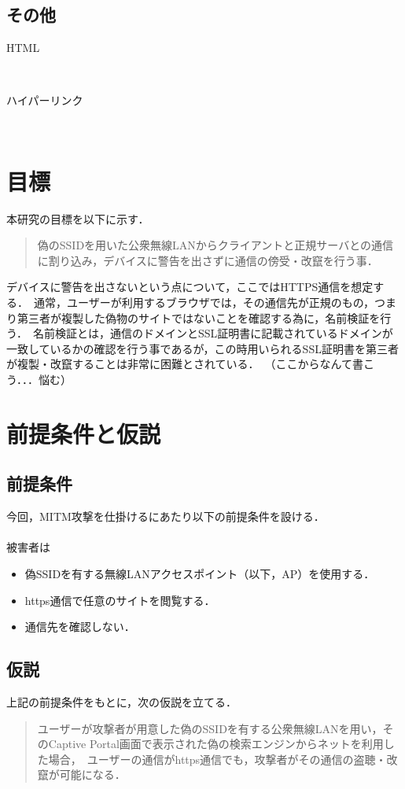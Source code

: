 \documentclass[dvipdfmx]{jsarticle}
\begin{document}
    \subsection{その他}
    \begin{description}
        \item[HTML]\mbox{}\\
        \item[ハイパーリンク]\mbox{}\\  
    \end{description}
    \section{目標}
    本研究の目標を以下に示す．
    \begin{quote}
        偽のSSIDを用いた公衆無線LANからクライアントと正規サーバとの通信に割り込み，デバイスに警告を出さずに通信の傍受・改竄を行う事．\
    \end{quote}
    デバイスに警告を出さないという点について，ここではHTTPS通信を想定する．\
    通常，ユーザーが利用するブラウザでは，その通信先が正規のもの，つまり第三者が複製した偽物のサイトではないことを確認する為に，名前検証を行う．\
    名前検証とは，通信のドメインとSSL証明書に記載されているドメインが一致しているかの確認を行う事であるが，この時用いられるSSL証明書を第三者が複製・改竄することは非常に困難とされている．\
    （ここからなんて書こう．．．悩む）
    \section{前提条件と仮説}
    \subsection{前提条件}
    今回，MITM攻撃を仕掛けるにあたり以下の前提条件を設ける．\\
    \\
    被害者は
    \begin{itemize}
        \item 偽SSIDを有する無線LANアクセスポイント（以下，AP）を使用する．
        \item https通信で任意のサイトを閲覧する．
        \item 通信先を確認しない．
    \end{itemize}
    \subsection{仮説}
    上記の前提条件をもとに，次の仮説を立てる．
    \begin{quote}
        ユーザーが攻撃者が用意した偽のSSIDを有する公衆無線LANを用い，そのCaptive Portal画面で表示された偽の検索エンジンからネットを利用した場合，\
        ユーザーの通信がhttps通信でも，攻撃者がその通信の盗聴・改竄が可能になる．
    \end{quote}
\end{document}
